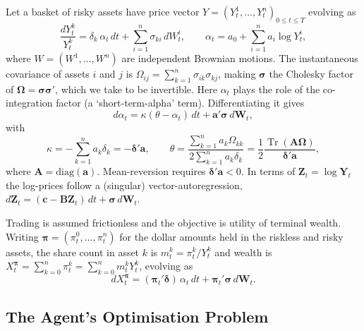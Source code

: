 \documentclass[11pt]{article}
\newcommand{\dd}{\,d}
\DeclareMathOperator{\Tr}{Tr}
\begin{document}
Let a basket of risky assets have price vector $Y = (Y^1_t,\dots,Y^n_t)_{0\le t\le T}$ evolving as
\begin{equation}\label{eq:115}
  \frac{dY^k_t}{Y^k_t} = \delta_k\,\alpha_t \dd t + \sum_{i=1}^n \sigma_{ki}\dd W^i_t,
  \qquad
  \alpha_t = a_0 + \sum_{i=1}^n a_i \log Y^i_t, \tag{11.5}
\end{equation}
where $W=(W^1,\dots,W^n)$ are independent Brownian motions. The instantaneous covariance of assets $i$
and $j$ is $\Omega_{ij} = \sum_{k=1}^n \sigma_{ik}\sigma_{kj}$, making $\bm\sigma$ the Cholesky factor
of $\bm\Omega = \bm\sigma\bm\sigma'$, which we take to be invertible. Here $\alpha_t$ plays the role of
the co-integration factor (a `short-term-alpha' term). Differentiating it gives
\begin{equation}\label{eq:116}
  d\alpha_t = \kappa(\theta - \alpha_t)\dd t + \bm a'\bm\sigma \dd \bm W_t, \tag{11.6}
\end{equation}
with
\begin{equation}
  \kappa = -\sum_{k=1}^n a_k \delta_k = -\bm\delta'\bm a,
  \qquad
  \theta = \frac{\sum_{k=1}^n a_k \Omega_{kk}}{2\sum_{k=1}^n a_k\delta_k}
    = \frac{1}{2}\frac{\Tr(\bm A\bm\Omega)}{\bm\delta'\bm a},
\end{equation}
where $\bm A = \mathrm{diag}(\bm a)$. Mean-reversion requires $\bm\delta'\bm a < 0$. In terms of
$\bm Z_t = \log \bm Y_t$ the log-prices follow a (singular) vector-autoregression,
$d\bm Z_t = (\bm c - \bm B\bm Z_t)\dd t + \bm\sigma\dd\bm W_t$.

Trading is assumed frictionless and the objective is utility of terminal wealth. Writing $\bm\pi =
(\pi^0_t,\dots,\pi^n_t)$ for the dollar amounts held in the riskless and risky assets, the share count
in asset $k$ is $m^k_t = \pi^k_t / Y^k_t$ and wealth is
$X^{\bm\pi}_t = \sum_{k=0}^n \pi^k_t = \sum_{k=0}^n m^k_t Y^k_t$, evolving as
\begin{equation}
  dX^{\bm\pi}_t = (\bm\pi_t'\bm\delta)\,\alpha_t \dd t + \bm\pi_t'\bm\sigma \dd\bm W_t.
\end{equation}

\subsection{The Agent's Optimisation Problem}
\end{document}
